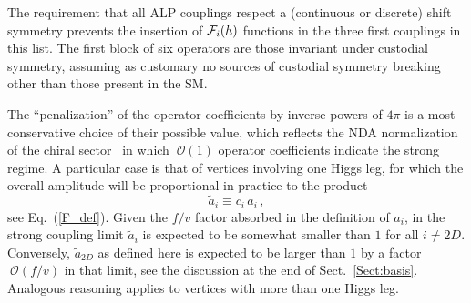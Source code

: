 \documentclass[11pt]{article}
\newcommand{\beq}{\begin{equation}}
\newcommand{\eeq}{\end{equation}}
\renewcommand{\[}{\begin{equation}}
\renewcommand{\]}{\end{equation}}
\def\cF{{\cal F}}
\begin{document}
The requirement that all ALP couplings respect a (continuous or discrete) shift symmetry prevents the insertion of $\cF_i(h)$ functions in the  three first couplings in this list.   The first block of six operators are those invariant under custodial symmetry, 
assuming as customary  no sources 
of custodial symmetry breaking other than those  present in the SM.  

The ``penalization'' of the operator coefficients by inverse powers of $4\pi$ is a most conservative choice of their possible value, which
reflects the NDA normalization of the chiral sector~\cite{Manohar:1983md,Luty:1997fk,Cohen:1997rt,Gavela:2016bzc} in which $~\mathcal{O}(1)$ operator coefficients 
indicate the strong regime.   
A particular case is that of vertices 
involving one Higgs leg, for which  the overall amplitude will be proportional in practice to the product 
\beq
\tilde{a}_i\equiv c_i\,a_i\,,
\label{atilde}
\eeq
see Eq.~(\ref{F_def}). Given the  $f/v$ factor absorbed in the definition of $a_i$, in the strong coupling limit $\tilde{a}_i$  is expected to be somewhat smaller 
than $1$ for all $i\ne2D$. Conversely,  $\tilde{a}_{2D}$ as defined here  is expected to be larger than $1$ by a factor $~\mathcal{O}(f/v)$ in that limit, 
see the discussion at the end of Sect.~\ref{Sect:basis}. 
 Analogous reasoning applies to vertices with more than one Higgs leg.


\end{document}
